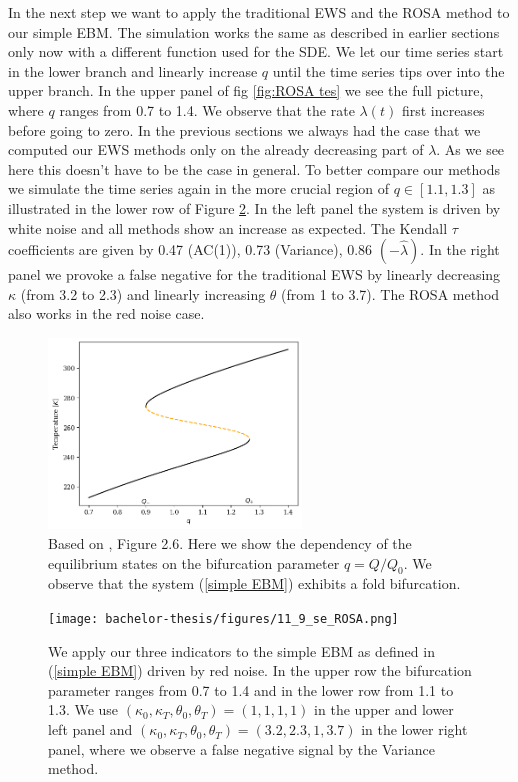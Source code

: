 \documentclass[%
thesis=student,%
coverpage=false,%
titlepage=false,%
headmarks=true, %
english,%
font=libertine, %
math=newpxtx, %
BCOR=5mm,%
coverBCOR=11mm%
]{tumbook}
\begin{document}
In the next step we want to apply the traditional EWS and the ROSA method to our simple EBM.
The simulation works the same as described in earlier sections only now with a different function used for the SDE. We let our time series start in the lower branch and linearly increase $q$ until the time series tips over into the upper branch. In the upper panel of fig \ref{fig:ROSA tes} we see the full picture, where $q$ ranges from 0.7 to 1.4. We observe that the rate $\lambda(t)$ first increases before going to zero. In the previous sections we always had the case that we computed our EWS methods only on the already decreasing part of $\lambda$. As we see here this doesn't have to be the case in general. To better compare our methods we simulate the time series again in the more crucial region of $q \in [1.1,1.3]$ as illustrated in the lower row of Figure \ref{fig:ROSA test}. In the left panel the system is driven by white noise and all methods show an increase as expected. The Kendall $\tau$ coefficients are given by 0.47 (AC(1)), 0.73 (Variance), 0.86 $(-\widehat{\lambda})$. In the right panel we provoke a false negative for the traditional EWS by linearly decreasing $\kappa$ (from 3.2 to 2.3) and linearly increasing $\theta$ (from 1 to 3.7). The ROSA method also works in the red noise case.

\begin{figure}[t]
    \centering
    \includegraphics[width=0.6\textwidth]{bachelor-thesis/figures/se_bif_plot.png}
    \caption{Based on \cite{Kaper:2013}, Figure 2.6. Here we show the dependency of the equilibrium states on the bifurcation parameter $q = Q/Q_{0}$. We observe that the system (\ref{simple EBM}) exhibits a fold bifurcation.   }
    \label{fig:se_bif}
\end{figure}



\begin{figure}[b]
    \centering
    \texttt{[image: bachelor-thesis/figures/11\_9\_se\_ROSA.png]}
    \caption{We apply our three indicators to the simple EBM as defined in (\ref{simple EBM}) driven by red noise. In the upper row the bifurcation parameter ranges from 0.7 to 1.4  and in the lower row from 1.1 to 1.3. We use $(\kappa_{0},\kappa_{T},\theta_{0},\theta_{T}) = (1,1,1,1)$ in the upper and lower left panel and $(\kappa_{0},\kappa_{T},\theta_{0},\theta_{T}) = (3.2,2.3,1,3.7)$ in the lower right panel, where we observe a false negative signal by the Variance method.}
    \label{fig:ROSA test}
\end{figure}
\end{document}

